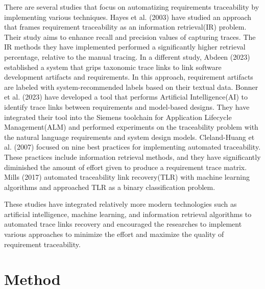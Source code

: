 \documentclass[conference]{IEEEtran}
\begin{document}
There are several studies that focus on automatizing requirements traceability by implementing various techniques. Hayes et al. (2003)\cite{hayes-2003} have studied an approach that frames requirement traceability as an information retrieval(IR) problem. Their study aims to enhance recall and precision values of capturing traces. The IR methods they have implemented performed a significantly higher retrieval percentage, relative to the manual tracing. In a different study, Abdeen (2023)\cite{abdeen-2023} established a system that grips taxonomic trace links to link software development artifacts and requirements. In this approach, requirement artifacts are labeled with system-recommended labels based on their textual data. Bonner et al. (2023)\cite{bonner-2023} have developed a tool that performs Artificial Intelligence(AI) to identify trace links between requirements and model-based designs. They have integrated their tool into the Siemens toolchain for Application Lifecycle Management(ALM) and performed experiments on the traceability problem with the natural language requirements and system design models. Cleland-Huang et al. (2007)\cite{cleland-huang-2007} focused on nine best practices for implementing automated traceability. These practices include information retrieval methods, and they have significantly diminished the amount of effort given to produce a requirement trace matrix. Mills (2017)\cite{mills-2017} automated traceability link recovery(TLR) with machine learning algorithms and approached TLR as a binary classification problem.

These studies have integrated relatively more modern technologies such as artificial intelligence, machine learning, and information retrieval algorithms to automated trace links recovery and encouraged the researches to implement various approaches to minimize the effort and maximize the quality of requirement traceability.



\section{Method}
\label{section:method}
\end{document}
